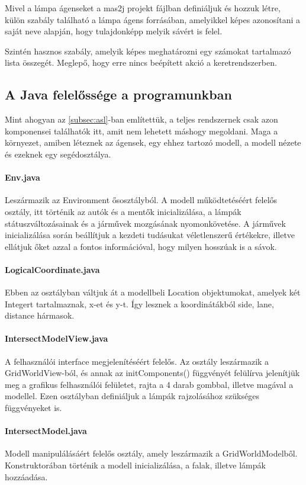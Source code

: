 \documentclass[a4paper, 11pt]{article}
\begin{document}
Mivel a lámpa ágenseket a mas2j projekt fájlban definiáljuk és hozzuk létre, külön szabály található a
lámpa ágens forrásában, amelyikkel képes azonosítani a saját neve alapján, hogy tulajdonképp melyik sávért
is felel.

Szintén hasznos szabály, amelyik képes meghatározni egy számokat tartalmazó lista összegét. Meglepő, hogy
erre nincs beépített akció a keretrendszerben.

\subsection{A Java felelőssége a programunkban}
Mint ahogyan az \autoref{subsec:asl}-ban említettük, a teljes rendszernek csak azon komponensei találhatók
itt, amit nem lehetett máshogy megoldani. Maga a környezet, amiben léteznek az ágensek, egy ehhez tartozó
modell, a modell nézete és ezeknek egy segédosztálya.

\paragraph{Env.java}
Leszármazik az Environment ősosztályból.
A modell működtetéséért felelős osztály, itt történik az autók és a mentők inicializálása,
a lámpák státuszváltozásainak és a járművek mozgásának nyomonkövetése.
A járművek inicializálása során beállítjuk a kezdeti tudásukat véletlenszerű értékekre, illetve
ellátjuk őket azzal a fontos információval, hogy milyen hosszúak is a sávok.

\paragraph{LogicalCoordinate.java}
Ebben az osztályban váltjuk át a modellbeli Location objektumokat, amelyek két Integert tartalmaznak, x-et és y-t. Így lesznek a koordinátákból side, lane, distance hármasok.
\paragraph{IntersectModelView.java}
A felhasználói interface megjelenítéséért felelős. Az osztály leszármazik a GridWorldView-ból, és annak az initComponents() függvényét felülírva jelenítjük meg a grafikus felhasználói felületet, rajta a 4 darab gombbal, illetve magával a modellel. Ezen osztályban definiáljuk a lámpák rajzolásához szükséges függvényeket is.
\paragraph{IntersectModel.java}
Modell manipulálásáért felelős osztály, amely leszármazik a GridWorldModelből. Konstruktorában történik a modell inicializálása, a falak, illetve lámpák hozzáadása.
\end{document}
